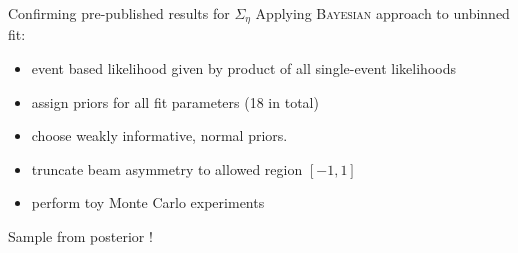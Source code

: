 \documentclass[11pt,aspectratio=169,dvipsnames]{beamer}
\begin{document}
		\begin{frame}{Confirming pre-published results for $\Sigma_\eta$}
		Applying \textsc{Bayesian} approach to unbinned fit:
		\begin{itemize}
			\item event based likelihood given by product of all single-event likelihoods 
			\item assign priors for all fit parameters (18 in total)
			\item choose weakly  informative, normal priors.
			\item truncate beam asymmetry to allowed region $[-1,1]$
			\item perform toy Monte Carlo experiments
		\end{itemize}
		Sample from posterior !
	\end{frame}
	
\end{document}
